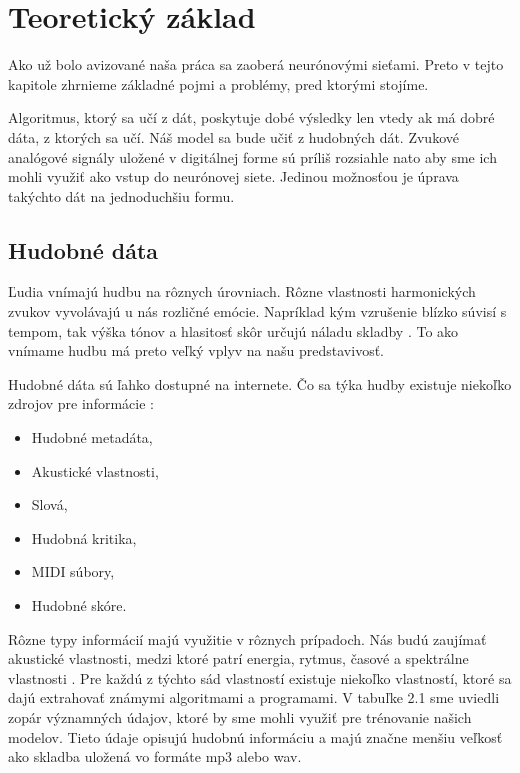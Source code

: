 \chapter{Teoretický základ}
\label{teoreticky_zaklad}

Ako už bolo avizované naša práca sa zaoberá neurónovými sieťami. Preto v tejto kapitole zhrnieme základné pojmi a problémy, pred ktorými stojíme.

Algoritmus, ktorý sa učí z dát, poskytuje dobé výsledky len vtedy ak má dobré dáta, z ktorých sa učí. 
Náš model sa bude učiť z hudobných dát.
Zvukové analógové signály uložené v digitálnej forme sú príliš rozsiahle nato aby sme ich mohli využiť ako vstup do neurónovej siete.
Jedinou možnosťou je úprava takýchto dát na jednoduchšiu formu.

\section{Hudobné dáta}
Ľudia vnímajú hudbu na rôznych úrovniach.
Rôzne vlastnosti harmonických zvukov vyvolávajú u nás rozličné emócie.
Napríklad kým vzrušenie blízko súvisí s tempom, tak výška tónov a hlasitosť skôr určujú náladu skladby \cite{emotionExtraction}.
To ako vnímame hudbu má preto veľký vplyv na našu predstavivosť.

Hudobné dáta sú ľahko dostupné na internete. Čo sa týka hudby existuje niekoľko zdrojov pre informácie \cite{musicMining}:
\begin{itemize}
	\item Hudobné metadáta,
	\item Akustické vlastnosti,
	\item Slová,
	\item Hudobná kritika,
	\item MIDI súbory,
	\item Hudobné skóre.
\end{itemize}
Rôzne typy informácií majú využitie v rôznych prípadoch.
Nás budú zaujímať akustické vlastnosti, medzi ktoré patrí energia, rytmus, časové a spektrálne vlastnosti \cite{emotionExtraction}.
Pre každú z týchto sád vlastností existuje niekoľko vlastností, ktoré sa dajú extrahovať známymi algoritmami a programami.
V tabuľke 2.1 sme uviedli zopár významných údajov, ktoré by sme mohli využiť pre trénovanie našich modelov.
Tieto údaje opisujú hudobnú informáciu a majú značne menšiu veľkosť ako skladba uložená vo formáte mp3 alebo wav.


